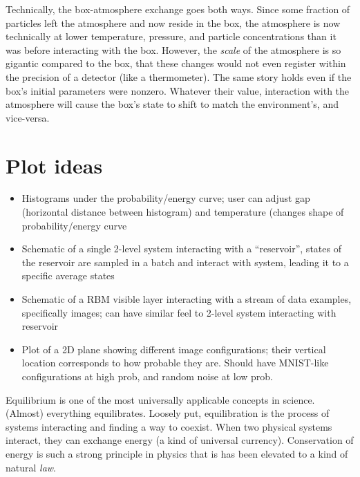 \documentclass[a4paper]{article}
\begin{document}
Technically, the box-atmosphere exchange goes both ways. Since some fraction of particles left the atmosphere and now reside in the box, the atmosphere is now technically at lower temperature, pressure, and particle concentrations than it was before interacting with the box. However, the \emph{scale} of the atmosphere is so gigantic compared to the box, that these changes would not even register within the precision of a detector (like a thermometer). The same story holds even if the box's initial parameters were nonzero. Whatever their value, interaction with the atmosphere will cause the box's state to shift to match the environment's, and vice-versa. 




\section{Plot ideas}
\begin{itemize}
 \item Histograms under the probability/energy curve; user can adjust gap (horizontal distance between histogram) and temperature (changes shape of probability/energy curve
 \item Schematic of a single 2-level system interacting with a ``reservoir'', states of the reservoir are sampled in a batch and interact with system, leading it to a specific average states
 \item Schematic of a RBM visible layer interacting with a stream of data examples, specifically images; can have similar feel to 2-level system interacting with reservoir
 \item Plot of a 2D plane showing different image configurations; their vertical location corresponds to how probable they are. Should have MNIST-like configurations at high prob, and random noise at low prob.
\end{itemize}


Equilibrium is one of the most universally applicable concepts in science. (Almost) everything equilibrates. Loosely put, equilibration is the process of systems interacting and finding a way to coexist. When two physical systems interact, they can exchange energy (a kind of universal currency). Conservation of energy is such a strong principle in physics that is has been elevated to a kind of natural \emph{law}.
\end{document}
